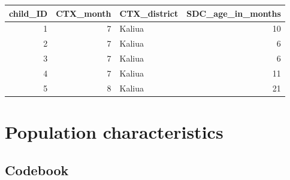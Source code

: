 \documentclass[
  letterpaper,
  DIV=11,
  numbers=noendperiod,
  oneside]{scrreprt}
\begin{document}
\begin{longtable}[]{@{}rrlr@{}}
\toprule()
child\_ID & CTX\_month & CTX\_district & SDC\_age\_in\_months \\
\midrule()
\endhead
1 & 7 & Kaliua & 10 \\
2 & 7 & Kaliua & 6 \\
3 & 7 & Kaliua & 6 \\
4 & 7 & Kaliua & 11 \\
5 & 8 & Kaliua & 21 \\
\bottomrule()
\end{longtable}

\hypertarget{population-characteristics-1}{%
\section{Population
characteristics}\label{population-characteristics-1}}

\hypertarget{codebook-1}{%
\subsection{Codebook}\label{codebook-1}}
\end{document}
